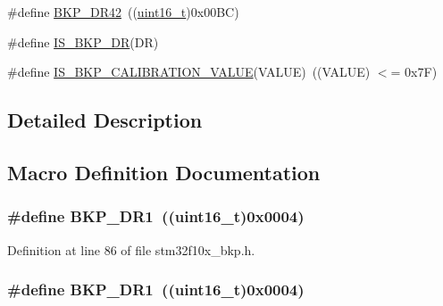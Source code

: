 \begin{DoxyCompactItemize}
\item 
\#define \hyperlink{group___data___backup___register_ga557d35e490957616b02672005f516542}{B\+K\+P\+\_\+\+D\+R42}~((\hyperlink{_p_e___types_8h_a1f1825b69244eb3ad2c7165ddc99c956}{uint16\+\_\+t})0x00\+B\+C)
\item 
\#define \hyperlink{group___data___backup___register_gaff069cf5458ccf0a94e2f784e2d610b8}{I\+S\+\_\+\+B\+K\+P\+\_\+\+DR}(DR)
\item 
\#define \hyperlink{group___data___backup___register_gafc3386eaa5383b64e9d706e5fe8dc1cf}{I\+S\+\_\+\+B\+K\+P\+\_\+\+C\+A\+L\+I\+B\+R\+A\+T\+I\+O\+N\+\_\+\+V\+A\+L\+UE}(V\+A\+L\+UE)~((V\+A\+L\+UE) $<$= 0x7\+F)
\end{DoxyCompactItemize}


\subsection{Detailed Description}


\subsection{Macro Definition Documentation}
\subsubsection[{\texorpdfstring{B\+K\+P\+\_\+\+D\+R1}{BKP_DR1}}]{\setlength{\rightskip}{0pt plus 5cm}\#define B\+K\+P\+\_\+\+D\+R1~(({\bf uint16\+\_\+t})0x0004)}\hypertarget{group___data___backup___register_ga5d4c3eeaccafcfc0ee3b5dc01381bab0}{}\label{group___data___backup___register_ga5d4c3eeaccafcfc0ee3b5dc01381bab0}


Definition at line 86 of file stm32f10x\+\_\+bkp.\+h.

\subsubsection[{\texorpdfstring{B\+K\+P\+\_\+\+D\+R1}{BKP_DR1}}]{\setlength{\rightskip}{0pt plus 5cm}\#define B\+K\+P\+\_\+\+D\+R1~(({\bf uint16\+\_\+t})0x0004)}\hypertarget{group___data___backup___register_ga5d4c3eeaccafcfc0ee3b5dc01381bab0}{}\label{group___data___backup___register_ga5d4c3eeaccafcfc0ee3b5dc01381bab0}


